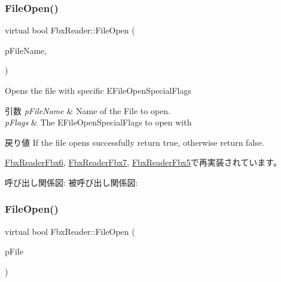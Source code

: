 \subsubsection{\texorpdfstring{File\+Open()}{FileOpen()}\hspace{0.1cm}{\footnotesize\ttfamily [3/4]}}
{\footnotesize\ttfamily virtual bool Fbx\+Reader\+::\+File\+Open (\begin{DoxyParamCaption}\item[{char $\ast$}]{p\+File\+Name,  }\item[{\hyperlink{class_fbx_reader_a1a14bd907bcda7dd48ba9b0a6236b7b8}{E\+File\+Open\+Special\+Flags}}]{ }\end{DoxyParamCaption})\hspace{0.3cm}{\ttfamily [virtual]}}

Opens the file with specific E\+File\+Open\+Special\+Flags 
\begin{DoxyParams}{引数}
{\em p\+File\+Name} & Name of the File to open. \\
\hline
{\em p\+Flags} & The E\+File\+Open\+Special\+Flags to open with \\
\hline
\end{DoxyParams}
\begin{DoxyReturn}{戻り値}
If the file opens successfully return true, otherwise return false. 
\end{DoxyReturn}


\hyperlink{class_fbx_reader_fbx6_a9a28e37abe39c65e899a9c6f0b705756}{Fbx\+Reader\+Fbx6}, \hyperlink{class_fbx_reader_fbx7_a003c93fdf81dc99380d0276e7643ac26}{Fbx\+Reader\+Fbx7}, \hyperlink{class_fbx_reader_fbx5_aa197089a894684834388a2caf43145e3}{Fbx\+Reader\+Fbx5}で再実装されています。

呼び出し関係図\+:
被呼び出し関係図\+:
\mbox{\label{class_fbx_reader_a9e334ad0c2abd069c35a016413a8adcd}} 
\subsubsection{\texorpdfstring{File\+Open()}{FileOpen()}\hspace{0.1cm}{\footnotesize\ttfamily [4/4]}}
{\footnotesize\ttfamily virtual bool Fbx\+Reader\+::\+File\+Open (\begin{DoxyParamCaption}\item[{\hyperlink{class_fbx_file}{Fbx\+File} $\ast$}]{p\+File }\end{DoxyParamCaption})\hspace{0.3cm}{\ttfamily [virtual]}}



